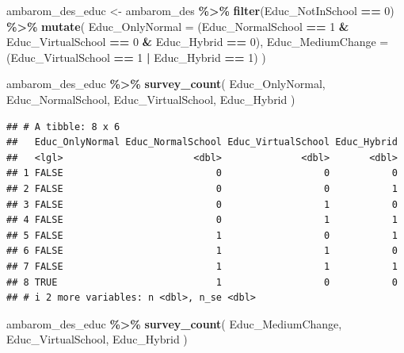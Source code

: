 \documentclass[
]{krantz}
\makeatletter
\newenvironment{Shaded}{\begin{snugshade}}{\end{snugshade}}
\newcommand{\AttributeTok}[1]{\textcolor[rgb]{0.27,0.27,0.27}{#1}}
\newcommand{\DecValTok}[1]{\textcolor[rgb]{0.06,0.06,0.06}{#1}}
\newcommand{\FunctionTok}[1]{\textcolor[rgb]{0.27,0.27,0.27}{\textbf{#1}}}
\newcommand{\NormalTok}[1]{#1}
\newcommand{\OtherTok}[1]{\textcolor[rgb]{0.37,0.37,0.37}{#1}}
\newcommand{\SpecialCharTok}[1]{\textcolor[rgb]{0.43,0.43,0.43}{\textbf{#1}}}
\newenvironment{kframe}{%
\medskip{}
\setlength{\fboxsep}{.8em}
 \def\at@end@of@kframe{}%
 \ifinner\ifhmode%
  \def\at@end@of@kframe{\end{minipage}}%
  \begin{minipage}{\columnwidth}%
 \fi\fi%
 \def\FrameCommand##1{\hskip\@totalleftmargin \hskip-\fboxsep
 \colorbox{shadecolor}{##1}\hskip-\fboxsep
     \hskip-\linewidth \hskip-\@totalleftmargin \hskip\columnwidth}%
 \MakeFramed {\advance\hsize-\width
   \@totalleftmargin\z@ \linewidth\hsize
   \@setminipage}}%
 {\par\unskip\endMakeFramed%
 \at@end@of@kframe}
\renewenvironment{Shaded}{\begin{kframe}}{\end{kframe}}
\makeatother
\begin{document}
\begin{Shaded}
\begin{Highlighting}[]
\NormalTok{ambarom\_des\_educ }\OtherTok{\textless{}{-}}\NormalTok{ ambarom\_des }\SpecialCharTok{\%\textgreater{}\%}
  \FunctionTok{filter}\NormalTok{(Educ\_NotInSchool }\SpecialCharTok{==} \DecValTok{0}\NormalTok{) }\SpecialCharTok{\%\textgreater{}\%}
  \FunctionTok{mutate}\NormalTok{(}
    \AttributeTok{Educ\_OnlyNormal =}\NormalTok{ (Educ\_NormalSchool }\SpecialCharTok{==} \DecValTok{1} \SpecialCharTok{\&}
\NormalTok{      Educ\_VirtualSchool }\SpecialCharTok{==} \DecValTok{0} \SpecialCharTok{\&}
\NormalTok{      Educ\_Hybrid }\SpecialCharTok{==} \DecValTok{0}\NormalTok{),}
    \AttributeTok{Educ\_MediumChange =}\NormalTok{ (Educ\_VirtualSchool }\SpecialCharTok{==} \DecValTok{1} \SpecialCharTok{|}
\NormalTok{      Educ\_Hybrid }\SpecialCharTok{==} \DecValTok{1}\NormalTok{)}
\NormalTok{  )}

\NormalTok{ambarom\_des\_educ }\SpecialCharTok{\%\textgreater{}\%}
  \FunctionTok{survey\_count}\NormalTok{(}
\NormalTok{    Educ\_OnlyNormal,}
\NormalTok{    Educ\_NormalSchool,}
\NormalTok{    Educ\_VirtualSchool,}
\NormalTok{    Educ\_Hybrid}
\NormalTok{  )}
\end{Highlighting}
\end{Shaded}

\begin{verbatim}
## # A tibble: 8 x 6
##   Educ_OnlyNormal Educ_NormalSchool Educ_VirtualSchool Educ_Hybrid
##   <lgl>                       <dbl>              <dbl>       <dbl>
## 1 FALSE                           0                  0           0
## 2 FALSE                           0                  0           1
## 3 FALSE                           0                  1           0
## 4 FALSE                           0                  1           1
## 5 FALSE                           1                  0           1
## 6 FALSE                           1                  1           0
## 7 FALSE                           1                  1           1
## 8 TRUE                            1                  0           0
## # i 2 more variables: n <dbl>, n_se <dbl>
\end{verbatim}

\begin{Shaded}
\begin{Highlighting}[]
\NormalTok{ambarom\_des\_educ }\SpecialCharTok{\%\textgreater{}\%}
  \FunctionTok{survey\_count}\NormalTok{(}
\NormalTok{    Educ\_MediumChange,}
\NormalTok{    Educ\_VirtualSchool,}
\NormalTok{    Educ\_Hybrid}
\NormalTok{  )}
\end{Highlighting}
\end{Shaded}
\end{document}
